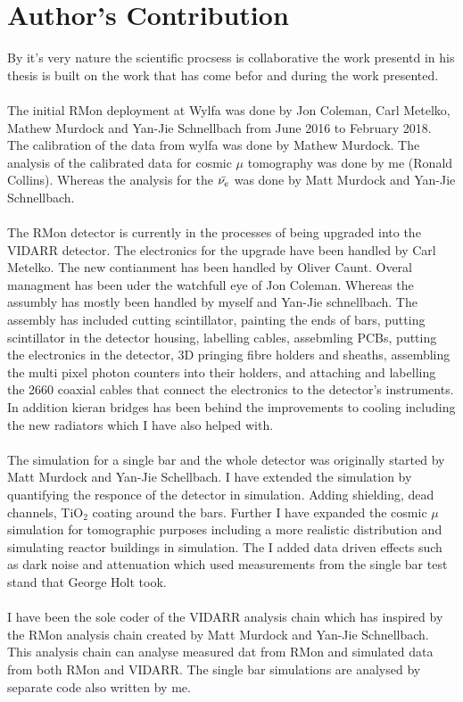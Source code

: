 \chapter{Author's Contribution}

By it's very nature the scientific procsess is collaborative the work presentd in his thesis is built on the work that has come befor and during the work presented. 
\\\\The initial RMon deployment at Wylfa was done by Jon Coleman, Carl Metelko, Mathew Murdock and Yan-Jie Schnellbach from June 2016 to February 2018. The calibration of the data from wylfa was done by Mathew Murdock. The analysis of the calibrated data for cosmic $\mu$ tomography was done by me (Ronald Collins). Whereas the analysis for the $\Bar{\nu_e}$ was done by Matt Murdock and Yan-Jie Schnellbach. 
\\\\The RMon detector is currently in the processes of being upgraded into the VIDARR detector. The electronics for the upgrade have been handled by Carl Metelko. The new contianment has been handled by Oliver Caunt. Overal managment has been uder the watchfull eye of Jon Coleman. Whereas the assumbly has mostly been handled by myself and Yan-Jie schnellbach. The assembly has included cutting scintillator, painting the ends of bars, putting scintillator in the detector housing, labelling cables, assebmling PCBs, putting the electronics in the detector, 3D pringing fibre holders and sheaths, assembling the multi pixel photon counters into their holders, and attaching and labelling the 2660 coaxial cables that connect the electronics to the detector's instruments. In addition kieran bridges has been behind the improvements to cooling including the new radiators which I have also helped with. 
\\\\The simulation for a single bar and the whole detector was originally started by Matt Murdock and Yan-Jie Schellbach.  I have extended the simulation by quantifying the responce of the detector in simulation. Adding shielding, dead channels, TiO$_2$ coating around the bars. Further I have expanded the cosmic $\mu$  simulation for tomographic purposes including a more realistic distribution and simulating reactor buildings in simulation. The I added data driven effects such as dark noise and attenuation which used measurements from the single bar test stand that George Holt took. 
\\\\I have been the sole coder of the VIDARR analysis chain which has inspired by the RMon analysis chain created by Matt Murdock and Yan-Jie Schnellbach. This analysis chain can analyse measured dat from RMon and simulated data from both RMon and VIDARR. The single bar simulations are analysed by separate code also written by me. 
